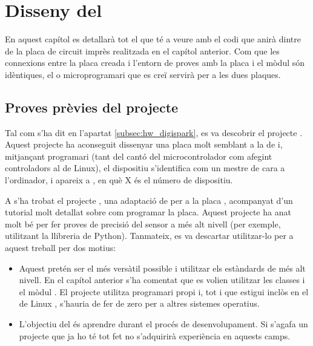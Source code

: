 \chapter{Disseny del }

En aquest capítol es detallarà tot el que té a veure amb el codi que anirà dintre 
de la placa de circuit imprès realitzada en el capítol anterior. Com que les
connexions entre la placa creada i l'entorn de proves amb la placa 
i el mòdul  són idèntiques, el  o microprogramari que 
es creï servirà per a les dues plaques.

\section{Proves prèvies del projecte }
\label{sec:testinc-i2c-tiny}

Tal com s'ha dit en l'apartat \ref{subsec:hw_digispark}, es va descobrir
el projecte  \cite{I2cTinyUsb}.
Aquest projecte ha aconseguit dissenyar
una placa molt semblant a la de  i, mitjançant programari (tant
del cantó del microcontrolador com afegint controladors al  de
Linux), el dispositiu s'identifica com un mestre  de cara a
l'ordinador, i apareix a , en què X és el número de dispositiu.

A \cite{i2cOnLittleWireBuilding} s'ha trobat el projecte
, una adaptació de
 per a la placa , acompanyat d'un tutorial 
molt detallat sobre com programar la placa.
Aquest projecte ha anat molt bé per fer proves de precisió del sensor a més
alt nivell (per exemple, utilitzant la llibreria  de Python). Tanmateix,
es va descartar utilitzar-lo per a aquest treball per dos motius:

\begin{itemize}
    \item Aquest  pretén ser el més versàtil possible i utilitzar
    els estàndards de més alt nivell. En el capítol anterior s'ha comentat que
    es volien utilitzar les classes  i el mòdul . El projecte
     utilitza programari propi i, tot i que estigui inclòs
    en el  de Linux \cite{I2cTinyKernel}, s'hauria de fer de zero
    per a altres sistemes operatius.
    \item L'objectiu del  és aprendre durant el procés de
    desenvolupament. Si s'agafa un projecte que ja ho té tot fet no s'adquirirà
    experiència en aquests camps.
\end{itemize}

